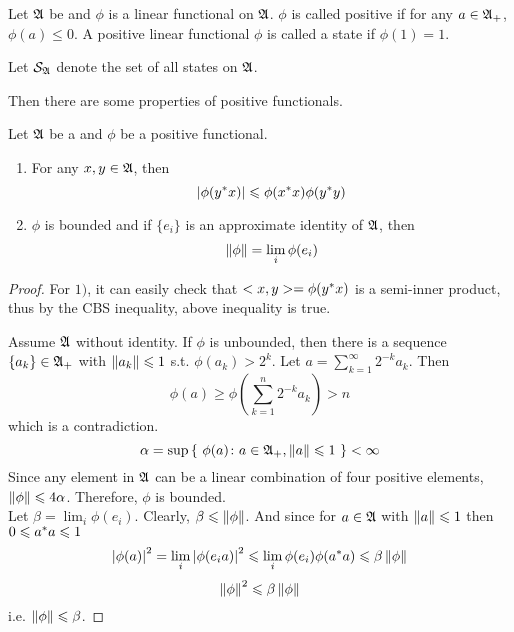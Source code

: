\documentclass[a4paper,11pt]{report}
\begin{document}
\begin{defn}
	Let $\mathfrak{A}$ be \Cs and $\phi$ is a linear functional on $\mathfrak{A}$. $\phi$ is called positive if for any $a \in \mathfrak{A}_{+}$, $\phi(a) \leqslant 0$. A positive linear functional $\phi$ is called a state if $\phi(1) = 1$.
\end{defn}
\begin{rem}
	Let $\mathcal{S}_{\mathfrak{A}}$ denote the set of all states on $\mathfrak{A}$.
\end{rem}

Then there are some properties of positive functionals.

\begin{prop}
	Let $\mathfrak{A}$ be a \Cs and $\phi$ be a positive functional.
	\begin{enumerate}[label=\arabic*)]
		\item For any $x,y \in \mathfrak{A}$, then
		\begin{equation*}
			\left\lvert\phi(y^{*}x)\right\lvert \leqslant \phi(x^{*}x)\phi(y^{*}y)
		\end{equation*}
		\item $\phi$ is bounded and if $\{e_i\}$ is an approximate identity of $\mathfrak{A}$, then
		\begin{equation*}
			\left\lVert\phi\right\lVert = \lim_{i} \phi(e_i)
		\end{equation*}
	\end{enumerate}
\end{prop}
\begin{proof}
	For $1)$, it can easily check that $<x,y> = \phi(y^{*}x)$ is a semi-inner product, thus by the CBS inequality, above inequality is true.
	\item Assume $\mathfrak{A}$ without identity.  If $\phi$ is unbounded, then there is a sequence $\{a_k\} \in \mathfrak{A}_{+}$ with $\left\lVert a_k\right\lVert \leqslant 1$ s.t. $\phi(a_k) > 2^k$. Let $a = \sum_{k=1}^{\infty} 2^{-k} a_k$. Then
	\begin{equation*}
		\phi(a) \geqslant \phi(\sum_{k=1}^{n} 2^{-k} a_k) > n
	\end{equation*}
	which is a contradiction.
	\begin{equation*}
		\alpha = \sup{\{~\phi(a) \colon a \in \mathfrak{A}_{+}, \left\lVert a\right\lVert \leqslant 1~\}} < \infty
	\end{equation*} 
	Since any element in $\mathfrak{A}$ can be a linear combination of four positive elements, $\left\lVert\phi\right\lVert \leqslant 4\alpha$. Therefore, $\phi$ is bounded.\\
	Let $\beta = \lim_{i}\phi(e_i)$. Clearly, $\beta \leqslant \left\lVert\phi\right\lVert$. And since for $a \in \mathfrak{A}$ with $\left\lVert a\right\lVert \leqslant 1$ then $0 \leqslant a^{*}a \leqslant 1$
	\begin{equation*}
		\left\lvert\phi(a)\right\lvert^2 = \lim_{i} \left\lvert\phi(e_ia)\right\lvert^2 \leqslant \lim_{i}\phi(e_i)\phi(a^{*}a) \leqslant \beta \left\lVert\phi\right\lVert
	\end{equation*}	
	\begin{equation*}
		\left\lVert\phi\right\lVert^2 \leqslant \beta \left\lVert\phi\right\lVert
	\end{equation*}
	i.e. $\left\lVert\phi\right\lVert \leqslant \beta$.
\end{proof}
\end{document}
